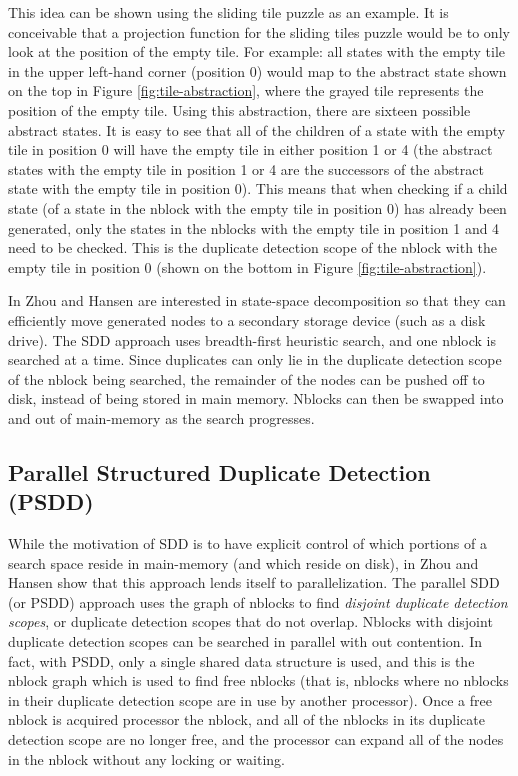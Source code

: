 \documentclass{article}
\begin{document}
This idea can be shown using the sliding tile puzzle as an example.
It is conceivable that a projection function for the sliding tiles
puzzle would be to only look at the position of the empty tile.  For
example: all states with the empty tile in the upper left-hand corner
(position 0) would map to the abstract state shown on the top in
Figure \ref{fig:tile-abstraction}, where the grayed tile represents
the position of the empty tile.  Using this abstraction, there are
sixteen possible abstract states.  It is easy to see that all of the
children of a state with the empty tile in position 0 will have the
empty tile in either position 1 or 4 (the abstract states with the
empty tile in position 1 or 4 are the successors of the abstract state
with the empty tile in position 0).  This means that when checking if
a child state (of a state in the nblock with the empty tile in
position 0) has already been generated, only the states in the nblocks
with the empty tile in position 1 and 4 need to be checked.  This is
the duplicate detection scope of the nblock with the empty tile in
position 0 (shown on the bottom in Figure \ref{fig:tile-abstraction}).

In \cite{zhou:sdd} Zhou and Hansen are interested in state-space
decomposition so that they can efficiently move generated nodes to a
secondary storage device (such as a disk drive).  The SDD approach
uses breadth-first heuristic search, and one nblock is searched at a
time.  Since duplicates can only lie in the duplicate detection scope
of the nblock being searched, the remainder of the nodes can be pushed
off to disk, instead of being stored in main memory.  Nblocks can then
be swapped into and out of main-memory as the search progresses.

\subsection{Parallel Structured Duplicate Detection (PSDD)}

While the motivation of SDD is to have explicit control of which
portions of a search space reside in main-memory (and which reside on
disk), in \cite{zhou:psd} Zhou and Hansen show that this approach
lends itself to parallelization.  The parallel SDD (or PSDD) approach
uses the graph of nblocks to find \emph{disjoint duplicate detection
  scopes}, or duplicate detection scopes that do not overlap.  Nblocks
with disjoint duplicate detection scopes can be searched in parallel
with out contention.  In fact, with PSDD, only a single shared
data structure is used, and this is the nblock graph which is used to
find free nblocks (that is, nblocks where no nblocks in their
duplicate detection scope are in use by another processor).  Once a
free nblock is acquired processor the nblock, and all of the nblocks
in its duplicate detection scope are no longer free, and the processor
can expand all of the nodes in the nblock without any locking or
waiting.
\end{document}
